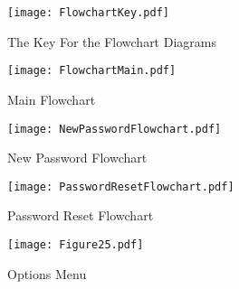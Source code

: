 \begin{landscape}
\begin{figure}[H]
\caption{The Key For the Flowchart Diagrams} \label{fig:FlowchartKey}
\hfill\texttt{[image: FlowchartKey.pdf]}\hspace*{\fill}
\end{figure}
\pagebreak

\begin{figure}[H]
\caption{Main Flowchart} \label{fig:LogInFlowchart}
\hfill\texttt{[image: FlowchartMain.pdf]}\hspace*{\fill}
\end{figure}
\pagebreak

\begin{figure}[H]
\caption{New Password Flowchart} \label{fig:New Password Flowchart}
\hfill\texttt{[image: NewPasswordFlowchart.pdf]}\hspace*{\fill}
\end{figure}
\pagebreak


\begin{figure}[H]
\caption{Password Reset Flowchart} \label{fig:Password Reset Flowchart}
\hfill\texttt{[image: PasswordResetFlowchart.pdf]}\hspace*{\fill}
\end{figure}
\pagebreak

\end{landscape}

\begin{figure}[H]
\caption{Options Menu} \label{fig:Options Menu}
\hfill\texttt{[image: Figure25.pdf]}\hspace*{\fill}
\end{figure}
\pagebreak

